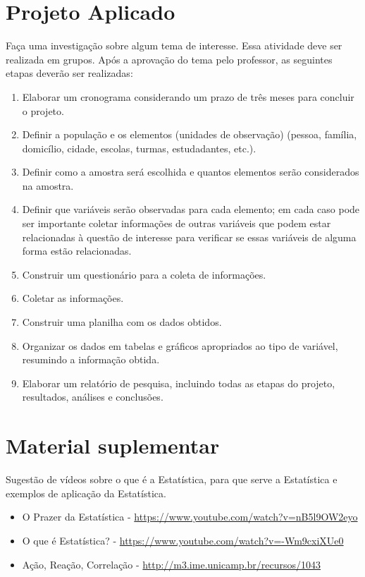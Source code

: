 \section{Projeto Aplicado}
\label{est1-projeto-1}

Faça uma investigação sobre algum tema de interesse. Essa atividade deve ser realizada em grupos.  Após a aprovação do tema pelo professor, as seguintes etapas deverão ser realizadas:
\begin{enumerate}
\item {} 
Elaborar um cronograma considerando um prazo de três meses para concluir o projeto.

\item {} 
Definir a população e os elementos (unidades de observação) (pessoa, família, domicílio, cidade, escolas, turmas, estudadantes, etc.).

\item {} 
Definir como a amostra será escolhida e quantos elementos serão considerados na amostra.

\item {} 
Definir que variáveis serão observadas para cada elemento; em cada caso pode ser importante coletar informações de outras variáveis que podem estar relacionadas à questão de interesse para verificar se essas variáveis de alguma forma estão relacionadas.

\item {} 
Construir um questionário para a coleta de informações.

\item {} 
Coletar as informações.

\item {} 
Construir uma planilha com os dados obtidos.

\item {} 
Organizar os dados em tabelas e gráficos apropriados ao tipo de variável, resumindo a informação obtida.

\item {} 
Elaborar um relatório de pesquisa, incluindo todas as etapas do projeto, resultados, análises e conclusões.

\end{enumerate}


\section{Material suplementar}
\label{est1-suplementar-1}

Sugestão de vídeos sobre o que é a Estatística, para que serve a Estatística e exemplos de aplicação da Estatística.
\begin{itemize}
\item {} 
O Prazer da Estatística - \url{https://www.youtube.com/watch?v=nB5l9OW2eyo}

\item {} 
O que é Estatística? - \url{https://www.youtube.com/watch?v=-Wm9cxiXUe0}

\item {} 
Ação, Reação, Correlação - \url{http://m3.ime.unicamp.br/recursos/1043}

\end{itemize}

